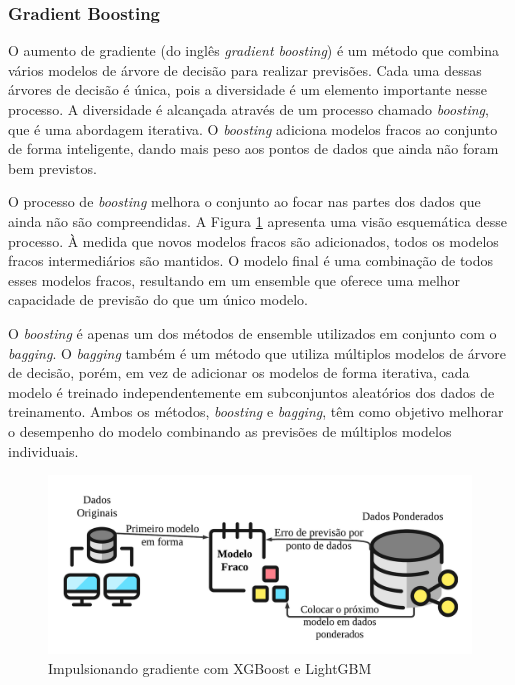  
 \subsubsection{Gradient Boosting}\label{subsubsec:lgbxgb}
 
 O aumento de gradiente (do inglês \textit{gradient boosting}) é um método que combina vários modelos de árvore de decisão para realizar previsões. Cada uma dessas árvores de decisão é única, pois a diversidade é um elemento importante nesse processo. A diversidade é alcançada através de um processo chamado \textit{boosting}, que é uma abordagem iterativa. O \textit{boosting} adiciona modelos fracos ao conjunto de forma inteligente, dando mais peso aos pontos de dados que ainda não foram bem previstos. 
 
 O processo de \textit{boosting} melhora o conjunto ao focar nas partes dos dados que ainda não são compreendidas. A Figura \ref{fig:xgboos} apresenta uma visão esquemática desse processo. À medida que novos modelos fracos são adicionados, todos os modelos fracos intermediários são mantidos. O modelo final é uma combinação de todos esses modelos fracos, resultando em um ensemble que oferece uma melhor capacidade de previsão do que um único modelo.
 
 O \textit{boosting} é apenas um dos métodos de ensemble utilizados em conjunto com o \textit{bagging}. O \textit{bagging} também é um método que utiliza múltiplos modelos de árvore de decisão, porém, em vez de adicionar os modelos de forma iterativa, cada modelo é treinado independentemente em subconjuntos aleatórios dos dados de treinamento. Ambos os métodos, \textit{boosting} e \textit{bagging}, têm como objetivo melhorar o desempenho do modelo combinando as previsões de múltiplos modelos individuais.
 
 
 \begin{figure}[H]
 	\centering
 	\caption{Impulsionando gradiente com XGBoost e LightGBM}
 	\label{fig:xgboos}
 	\includegraphics[width=\linewidth]{Modelos/Figuras/xgboos}
 	
 \end{figure}
 
